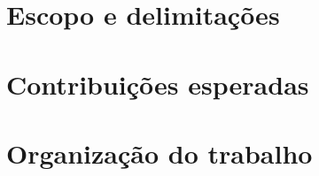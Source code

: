 \section{Escopo e delimitações}

\section{Contribuições esperadas}

\section{Organização do trabalho}
